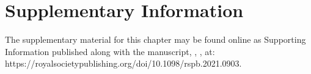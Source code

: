 \let\clearpage\relax
\let\cleardoublepage\relax
\let\cleardoublepage\relax

{\chapter*{Supplementary Information}}

The supplementary material for this chapter may be found online as Supporting Information published along with the manuscript, \textcite{netz2022}, , at:
https://royalsocietypublishing.org/doi/10.1098/rspb.2021.0903.


{ \begin{center}  \end{center} }

\endgroup

\afterpage{\nopagecolor}
\pagestyle{scrheadings}
